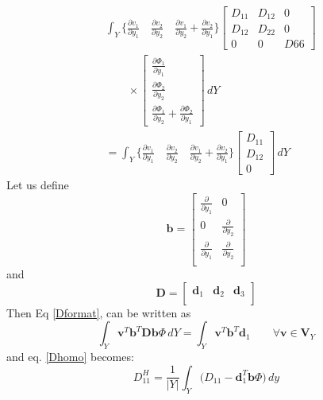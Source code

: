 \documentclass[10pt]{article}
\begin{document}
\begin{equation}
\begin{split}
&\int_Y\bigg\{\frac{\partial v_1}{\partial y_1}\quad\frac{\partial v_2}{\partial y_2}\quad\frac{\partial v_1}{\partial y_2}+\frac{\partial v_2}{\partial y_1}\bigg\}
\begin{bmatrix}
D_{11}	& D_{12} & 	0 \\
D_{12}	& D_{22} & 	0 \\
0		& 0		&	D66
\end{bmatrix}\\
&\qquad\times
\begin{bmatrix}
\frac{\partial \Phi_1}{\partial y_1}\\
\frac{\partial \Phi_2}{\partial y_2}\\
\frac{\partial \Phi_1}{\partial y_2}+\frac{\partial \Phi_2}{\partial y_1}
\end{bmatrix}\,dY\\
&=\int_Y\bigg\{\frac{\partial v_1}{\partial y_1}\quad\frac{\partial v_2}{\partial y_2}\quad\frac{\partial v_1}{\partial y_2}+\frac{\partial v_2}{\partial y_1}\bigg\}
\begin{bmatrix}
D_{11}\\
D_{12}\\
0
\end{bmatrix}\,dY
\end{split}
\end{equation}
Let us define
\begin{equation}
\textbf{b} = \begin{bmatrix}
\frac{\partial}{\partial y_1} & 0\\
0 & \frac{\partial}{\partial y_2}\\
\frac{\partial}{\partial y_1} &\frac{\partial}{\partial y_2}\\
\end{bmatrix}
\end{equation}
and 
\begin{equation}
\textbf{D} = \begin{bmatrix}
\textbf{d}_1 & \textbf{d}_2 & \textbf{d}_3\\
\end{bmatrix}
\end{equation}
Then Eq \eqref{Dformat}, can be written as
\begin{equation}
\int_Y \textbf{v}^T \textbf{b}^T \textbf{D} \textbf{b}\Phi\,dY = \int_Y\textbf{v}^T\textbf{b}^T\textbf{d}_1 \qquad \forall \textbf{v}\in\textbf{V}_Y
\end{equation}
and eq. \eqref{Dhomo} becomes:
\begin{equation}
\boxed{D^H_{11} = \frac{1}{|Y|}\int_Y\bigg (D_{11}-\textbf{d}_1^T\textbf{b}\Phi\bigg )\,dy
}
\end{equation}
\end{document}
